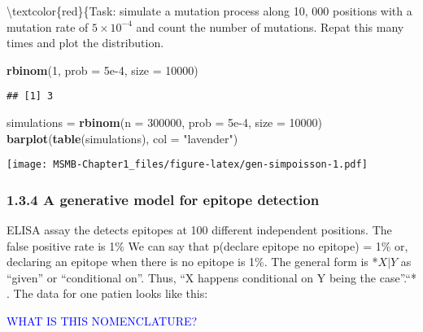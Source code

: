 \documentclass[]{article}
\newenvironment{Shaded}{\begin{snugshade}}{\end{snugshade}}
\newcommand{\KeywordTok}[1]{\textcolor[rgb]{0.13,0.29,0.53}{\textbf{#1}}}
\newcommand{\DataTypeTok}[1]{\textcolor[rgb]{0.13,0.29,0.53}{#1}}
\newcommand{\DecValTok}[1]{\textcolor[rgb]{0.00,0.00,0.81}{#1}}
\newcommand{\FloatTok}[1]{\textcolor[rgb]{0.00,0.00,0.81}{#1}}
\newcommand{\StringTok}[1]{\textcolor[rgb]{0.31,0.60,0.02}{#1}}
\newcommand{\NormalTok}[1]{#1}
\let\origfigure\figure
\let\endorigfigure\endfigure
\renewenvironment{figure}[1][2] {
    \expandafter\origfigure\expandafter[H]
} {
    \endorigfigure
}
\begin{document}
\textbackslash{}textcolor\{red\}\{Task: simulate a mutation process
along 10, 000 positions with a mutation rate of \(5\times10^{-4}\) and
count the number of mutations. Repat this many times and plot the
distribution.

\begin{Shaded}
\begin{Highlighting}[]
\KeywordTok{rbinom}\NormalTok{(}\DecValTok{1}\NormalTok{, }\DataTypeTok{prob =} \FloatTok{5e-4}\NormalTok{, }\DataTypeTok{size =} \DecValTok{10000}\NormalTok{)}
\end{Highlighting}
\end{Shaded}

\begin{verbatim}
## [1] 3
\end{verbatim}

\begin{Shaded}
\begin{Highlighting}[]
\NormalTok{simulations =}\StringTok{ }\KeywordTok{rbinom}\NormalTok{(}\DataTypeTok{n =} \DecValTok{300000}\NormalTok{, }\DataTypeTok{prob =} \FloatTok{5e-4}\NormalTok{, }\DataTypeTok{size =} \DecValTok{10000}\NormalTok{)}
\KeywordTok{barplot}\NormalTok{(}\KeywordTok{table}\NormalTok{(simulations), }\DataTypeTok{col =} \StringTok{"lavender"}\NormalTok{)}
\end{Highlighting}
\end{Shaded}

\begin{figure}
\centering
\texttt{[image: MSMB-Chapter1\_files/figure-latex/gen-simpoisson-1.pdf]}
\caption{Simulated distribution of B(10000, \(10^{-4}\)) for
(ref:gen-simpoisson-1) simulations.}
\end{figure}

\subsubsection{1.3.4 A generative model for epitope
detection}\label{a-generative-model-for-epitope-detection}

ELISA assay the detects epitopes at 100 different independent positions.
The false positive rate is 1\% We can say that p(declare epitope
\textbar{} no epitope) = 1\% or, declaring an epitope when there is no
epitope is 1\%. The general form is *\(X|Y\) as ``given'' or
``conditional on''. Thus, ``X happens conditional on Y being the
case''.``* . The data for one patien looks like this:

\textcolor{blue}{WHAT IS THIS NOMENCLATURE?}
\end{document}
